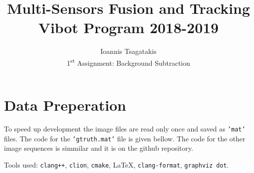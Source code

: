 \documentclass[a4paper,12pt]{article}
\begin{document}
\title{ Multi-Sensors Fusion and Tracking\\Vibot Program 2018-2019}
\author{Ioannis Tsagatakis\\
1\textsuperscript{st} Assignment: Background Subtraction} 
 
\maketitle

\section*{Data Preperation}
To speed up development the image files are read only once and saved as \texttt{'mat'} files. The code for the \texttt{'gtruth.mat'} file is given bellow. The code for the other image sequences is simmilar and it is on the github repository.



\vfill
\noindent Tools used: \texttt{clang++}, \texttt{clion},  \texttt{cmake}, \LaTeX{}, \texttt{clang-format}, \texttt{graphviz dot}.
\end{document}
